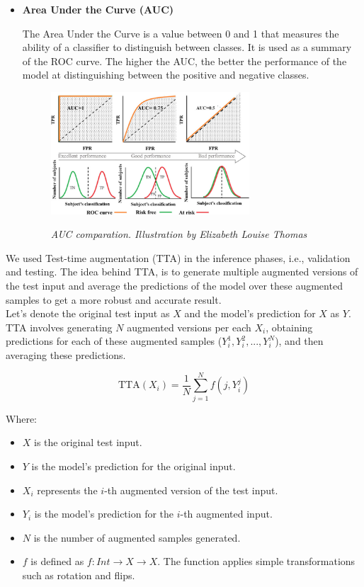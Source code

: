 \begin{itemize}
  \item {\bf Area Under the Curve (AUC)}

  The Area Under the Curve is a value between 0 and 1 that measures the
  ability of a classifier to distinguish between classes. It is used as a summary of
  the ROC curve. The higher the AUC, the better the performance of the model at
  distinguishing between the positive and negative classes.

  \begin{figure}[H]
    \centering
    \includegraphics[width=0.7\textwidth]{imatges/validation-strategy/auc.png}
    \caption[AUC-ROC performance]{\textit{AUC comparation. Illustration by Elizabeth Louise Thomas}}
    {\label{fig:auc-roc}}
  \end{figure}

\end{itemize}

\newpage

We used Test-time augmentation (TTA) in the inference phases, i.e., validation
and testing. The idea behind TTA, is to generate multiple augmented versions of
the test input and average the predictions of the model over these augmented
samples to get a more robust and accurate result. \\

Let's denote the original test input as \(X\) and the model's prediction for
\(X\) as \(Y\). TTA involves generating \(N\) augmented versions per each
\(X_i\), obtaining predictions for each of these augmented samples (\(Y_i^1, Y_i^2,
..., Y_i^N\)), and then averaging these predictions.

\[ \text{TTA}(X_i) = \frac{1}{N} \sum_{j=1}^{N} f(j, Y_i^j) \]

Where:

\begin{itemize}
  \item \(X\) is the original test input.
  \item \(Y\) is the model's prediction for the original input.
  \item \(X_i\) represents the \(i\)-th augmented version of the test input.
  \item \(Y_i\) is the model's prediction for the \(i\)-th augmented input.
  \item \(N\) is the number of augmented samples generated.
  \item \(f\) is defined as \(f: Int \rightarrow X \rightarrow X\). The
    function applies simple transformations such as rotation and flips.
\end{itemize}


